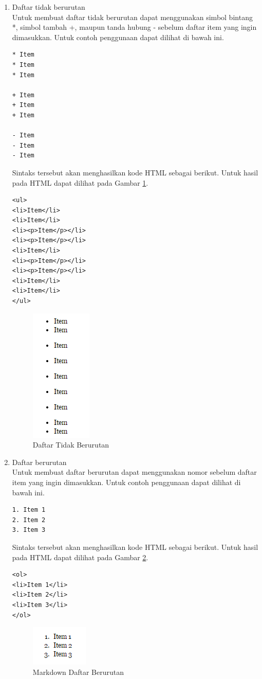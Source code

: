 \begin{enumerate}[(1)]
\item Daftar tidak berurutan\\
Untuk membuat daftar tidak berurutan dapat menggunakan simbol bintang *, simbol
tambah +, maupun tanda hubung - sebelum daftar item yang ingin dimasukkan. Untuk
contoh penggunaan dapat dilihat di bawah ini.
\begin{lstlisting}
* Item
* Item
* Item

+ Item
+ Item
+ Item

- Item
- Item
- Item
\end{lstlisting}
Sintaks tersebut akan menghasilkan kode HTML sebagai berikut. Untuk
hasil pada HTML dapat dilihat pada Gambar \ref{fig:daftartidakberurutan}.
\begin{lstlisting}
<ul>
<li>Item</li>
<li>Item</li>
<li><p>Item</p></li>
<li><p>Item</p></li>
<li>Item</li>
<li><p>Item</p></li>
<li><p>Item</p></li>
<li>Item</li>
<li>Item</li>
</ul>
\end{lstlisting}
\begin{figure}[H]
\centering
\includegraphics[scale=1]{Gambar/daftartidakberurutan.png}
\caption[Markdown Daftar Tidak Berurutan]{Daftar Tidak Berurutan}
\label{fig:daftartidakberurutan}
\end{figure}
\item Daftar berurutan\\
Untuk membuat daftar berurutan dapat menggunakan nomor sebelum daftar item yang
ingin dimasukkan. Untuk contoh penggunaan dapat dilihat di bawah ini.
\begin{lstlisting}
1. Item 1
2. Item 2
3. Item 3
\end{lstlisting}
Sintaks tersebut akan menghasilkan kode HTML sebagai berikut. Untuk
hasil pada HTML dapat dilihat pada Gambar \ref{fig:dafarberurutan}.
\begin{lstlisting}
<ol>
<li>Item 1</li>
<li>Item 2</li>
<li>Item 3</li>
</ol>
\end{lstlisting}
\begin{figure}[H]
\centering
\includegraphics[scale=1]{Gambar/dafarberurutan.png}
\caption[Markdown Daftar Berurutan]{Markdown Daftar Berurutan}
\label{fig:dafarberurutan}
\end{figure}
\end{enumerate}

